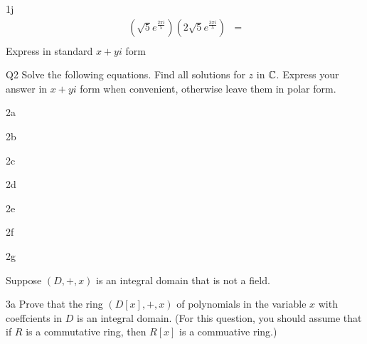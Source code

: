 \begin{question}{1j}
\begin{align*}
(\sqrt{5}e^{\frac{2\pi i}{5}})(2\sqrt{5}e^{\frac{3\pi i}{5}})
 &= \\ 
\end{align*}
Express in standard $x+yi$ form
\end{question}
\begin{question}{Q2}
Solve the following equations. Find all solutions for $z$ in $\mathbb{C}$. Express your answer in $x+yi$ form when convenient, otherwise leave them in polar form.
\end{question}

\begin{question}{2a}
\end{question}
\begin{question}{2b}
\end{question}
\begin{question}{2c}
\end{question}
\begin{question}{2d}
\end{question}
\begin{question}{2e}
\end{question}
\begin{question}{2f}
\end{question}
\begin{question}{2g}
\end{question}
\begin{question}{3}
Suppose $(D, +, x)$ is an integral domain that is not a field.
\end{question}
\begin{question}{3a}
Prove that the ring $(D[x], +, x)$ of polynomials in the variable $x$ with coeffcients in $D$ is an integral domain. (For this question, you should assume that if $R$ is a commutative ring, then $R[x]$ is a commuative ring.)
\end{question}

